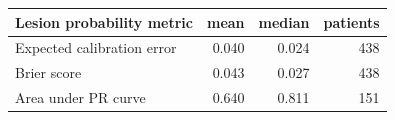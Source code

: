 \begin{tabular}{lrrr}
\toprule
Lesion probability metric & mean & median & patients \\
\midrule
Expected calibration error & 0.040 & 0.024 & 438 \\
Brier score & 0.043 & 0.027 & 438 \\
Area under PR curve & 0.640 & 0.811 & 151 \\
\bottomrule
\end{tabular}
